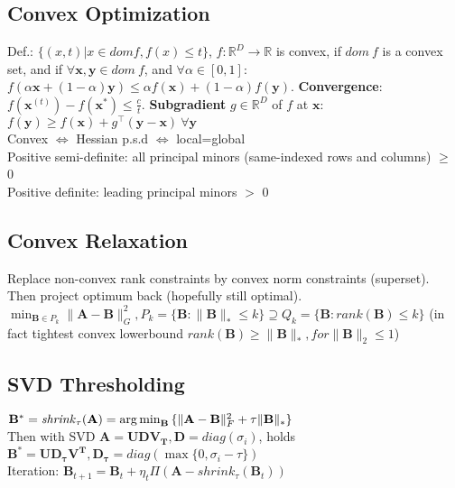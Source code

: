 \subsection*{Convex Optimization}
Def.: $\{(x,t)|x \in dom f, f(x) \leq t\}$, $f : \mathbb{R}^D \rightarrow \mathbb{R}$ is convex, if $dom\ f$ is a convex set, and if $\forall \mathbf{x}, \mathbf{y} \in dom\ f$, and $\forall \alpha\in[0,1]$: $f(\alpha \mathbf{x} + (1 - \alpha)\mathbf{y}) \leq \alpha f(\mathbf{x}) + (1-\alpha)f(\mathbf{y})$. \textbf{Convergence}: $f(\mathbf{x}^{(t)}) - f(\mathbf{x}^*) \le \frac{c}{t}$.
\textbf{Subgradient} $g \in \mathbb{R}^D$ of $f$ at $\mathbf{x}$: $f(\mathbf{y}) \geq f(\mathbf{x}) + g^\top(\mathbf{y}-\mathbf{x}) \ \forall \mathbf{y}$ \\
Convex $\iff$ Hessian p.s.d $\iff$ local=global \\
Positive semi-definite: all principal minors (same-indexed rows and columns) $\geq$ 0\\
Positive definite: leading principal minors $>$ 0

\subsection*{Convex Relaxation}
Replace non-convex rank constraints by convex norm constraints (superset). Then project optimum back (hopefully still optimal).\\
$\min_{\mathbf{B}\in P_k}{\|\mathbf{A-B}\|^2_G}, P_k=\{\mathbf{B}:\|\mathbf{B}\|_{*}\leq k\}\supseteq Q_k=\{\mathbf{B}:\mathit{rank}(\mathbf{B})\leq k\}$ (in fact tightest convex lowerbound $\mathit{rank}(\mathbf{B})\geq \|\mathbf{B}\|_{*}, for \|\mathbf{B}\|_2 \leq 1$)

\subsection*{SVD Thresholding}
$\mathbf{B}^{*}=\mathit{shrink}_\tau(\mathbf{A})=\operatorname*{arg\,min}_{\mathbf{B}}{\{\|\mathbf{A-B}\|^2_F + \tau\|\mathbf{B}\|_{*}\}}$\\
Then with SVD $\mathbf{A=UDV_T}, \mathbf{D}=\mathit{diag}(\sigma_i)$, holds $\mathbf{B^*=UD_\tau V^T, D_\tau} = \mathit{diag}(\max\{0,\sigma_i - \tau\})$ \\
Iteration: $\mathbf{B}_{t+1}=\mathbf{B}_t + \eta_t \Pi(\mathbf{A} - \mathit{shrink}_\tau(\mathbf{B}_t))$